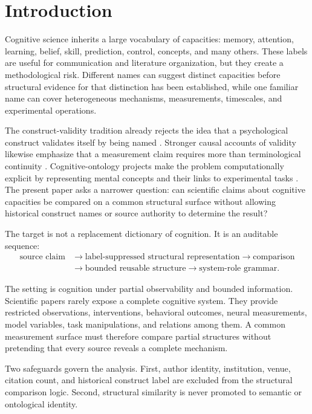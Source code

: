 \documentclass[11pt]{article}
\begin{document}
\section{Introduction}

Cognitive science inherits a large vocabulary of capacities: memory, attention, learning, belief, skill, prediction, control, concepts, and many others. These labels are useful for communication and literature organization, but they create a methodological risk. Different names can suggest distinct capacities before structural evidence for that distinction has been established, while one familiar name can cover heterogeneous mechanisms, measurements, timescales, and experimental operations.

The construct-validity tradition already rejects the idea that a psychological construct validates itself by being named \citep{CronbachMeehl1955ConstructValidity}. Stronger causal accounts of validity likewise emphasize that a measurement claim requires more than terminological continuity \citep{BorsboomMellenberghVanHeerden2004Validity}. Cognitive-ontology projects make the problem computationally explicit by representing mental concepts and their links to experimental tasks \citep{PoldrackEtAl2011CognitiveAtlas,TurnerLaird2012CogPO,PoldrackYarkoni2016CognitiveOntologies}. The present paper asks a narrower question: can scientific claims about cognitive capacities be compared on a common structural surface without allowing historical construct names or source authority to determine the result?

The target is not a replacement dictionary of cognition. It is an auditable sequence:
\[
\begin{aligned}
\text{source claim}
&\rightarrow
\text{label-suppressed structural representation}
\rightarrow
\text{comparison}
\\
&\rightarrow
\text{bounded reusable structure}
\rightarrow
\text{system-role grammar}.
\end{aligned}
\]

The setting is cognition under partial observability and bounded information. Scientific papers rarely expose a complete cognitive system. They provide restricted observations, interventions, behavioral outcomes, neural measurements, model variables, task manipulations, and relations among them. A common measurement surface must therefore compare partial structures without pretending that every source reveals a complete mechanism.

Two safeguards govern the analysis. First, author identity, institution, venue, citation count, and historical construct label are excluded from the structural comparison logic. Second, structural similarity is never promoted to semantic or ontological identity.
\end{document}
